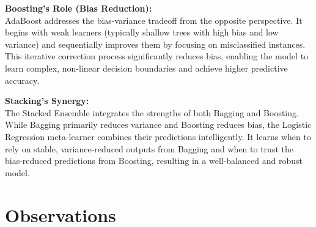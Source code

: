 \documentclass[11pt]{article}
\begin{document}
\vspace{0.5cm}

\textbf{Boosting's Role (Bias Reduction):} \\
AdaBoost addresses the bias-variance tradeoff from the opposite perspective. It begins with weak learners (typically shallow trees with high bias and low variance) and sequentially improves them by focusing on misclassified instances. This iterative correction process significantly reduces bias, enabling the model to learn complex, non-linear decision boundaries and achieve higher predictive accuracy.

\vspace{0.5cm}

\textbf{Stacking's Synergy:} \\
The Stacked Ensemble integrates the strengths of both Bagging and Boosting. While Bagging primarily reduces variance and Boosting reduces bias, the Logistic Regression meta-learner combines their predictions intelligently. It learns when to rely on stable, variance-reduced outputs from Bagging and when to trust the bias-reduced predictions from Boosting, resulting in a well-balanced and robust model.
\section{Observations}
\end{document}
